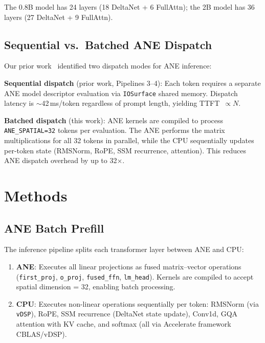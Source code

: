 \documentclass[11pt]{article}
\begin{document}
The 0.8B model has 24 layers (18 DeltaNet + 6 FullAttn); the 2B model
has 36 layers (27 DeltaNet + 9 FullAttn).

\subsection{Sequential vs.\ Batched ANE Dispatch}

Our prior work~\cite{atomgradient2026hybrid} identified two dispatch
modes for ANE inference:

\textbf{Sequential dispatch} (prior work, Pipelines 3--4): Each token
requires a separate ANE model descriptor evaluation
via \texttt{IOSurface} shared memory. Dispatch latency is
$\sim$42\,ms/token regardless of prompt length, yielding
TTFT~$\propto N$.

\textbf{Batched dispatch} (this work): ANE kernels are compiled to process
\texttt{ANE\_SPATIAL=32} tokens per evaluation. The ANE performs the
matrix multiplications for all 32 tokens in parallel, while the CPU
sequentially updates per-token state (RMSNorm, RoPE, SSM recurrence,
attention). This reduces ANE dispatch overhead by up to 32$\times$.

\section{Methods}
\label{sec:methods}

\subsection{ANE Batch Prefill}

The inference pipeline splits each transformer layer between ANE and CPU:

\begin{enumerate}[nosep]
  \item \textbf{ANE}: Executes all linear projections as fused
        matrix--vector operations (\texttt{first\_proj}, \texttt{o\_proj},
        \texttt{fused\_ffn}, \texttt{lm\_head}). Kernels are compiled to
        accept spatial dimension = 32, enabling batch processing.
  \item \textbf{CPU}: Executes non-linear operations sequentially per
        token: RMSNorm (via \texttt{vDSP}), RoPE, SSM recurrence
        (DeltaNet state update), Conv1d, GQA attention with KV cache, and
        softmax (all via Accelerate framework CBLAS/vDSP).
\end{enumerate}
\end{document}
